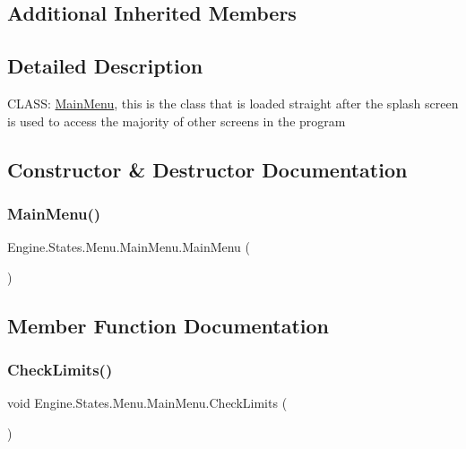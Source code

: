 \subsection*{Additional Inherited Members}


\subsection{Detailed Description}
C\+L\+A\+SS\+: \hyperlink{a00574}{Main\+Menu}, this is the class that is loaded straight after the splash screen is used to access the majority of other screens in the program 



\subsection{Constructor \& Destructor Documentation}
\mbox{\label{a00574_a90df30106a466b9da59ebda89c6172db}} 
\subsubsection{\texorpdfstring{Main\+Menu()}{MainMenu()}}
{\footnotesize\ttfamily Engine.\+States.\+Menu.\+Main\+Menu.\+Main\+Menu (\begin{DoxyParamCaption}{ }\end{DoxyParamCaption})\hspace{0.3cm}{\ttfamily [inline]}}



\subsection{Member Function Documentation}
\mbox{\label{a00574_a18a59c1bc70e322805c36a3ca5c7d107}} 
\subsubsection{\texorpdfstring{Check\+Limits()}{CheckLimits()}}
{\footnotesize\ttfamily void Engine.\+States.\+Menu.\+Main\+Menu.\+Check\+Limits (\begin{DoxyParamCaption}{ }\end{DoxyParamCaption})\hspace{0.3cm}{\ttfamily [inline]}}

